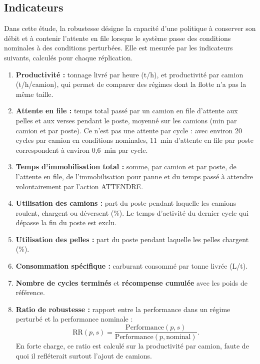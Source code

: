 \documentclass[11pt,a4paper]{article}
\newif\ifrevmarks
\newcommand{\revtag}[1]{\ifrevmarks\textsuperscript{\textcolor{red!70!black}{\scriptsize[#1]}}\fi}
\newcommand{\rev}[2]{\ifrevmarks{\color{revcolor}#2}\revtag{#1}\else#2\fi}
\newenvironment{revbloc}[1]{\par\ifrevmarks\color{revcolor}\noindent\revtag{#1}\ \fi}{\par}
\newif\ifcorrmarks
\newcommand{\corr}[1]{\ifcorrmarks\textcolor{corrcolor}{#1}\else#1\fi}
\begin{document}
\subsection{Indicateurs}
\label{sec:metrics}

\begin{revbloc}{M2, M21, M15, m18}
\corr{Dans cette étude, la robustesse désigne} la capacité d'une politique à conserver son débit et à contenir l'attente en file lorsque le système passe des conditions nominales à des conditions perturbées. Elle est mesurée par les indicateurs suivants, calculés pour chaque réplication.

\begin{enumerate}
  \item \textbf{Productivité :} tonnage livré par heure (t/h), et productivité par camion (t/h/camion), qui permet de comparer des régimes dont la flotte n'a pas la même taille.
  \item \textbf{Attente en file :} temps total passé par un camion en file d'attente aux pelles et aux verses pendant le poste, moyenné sur les camions (min par camion et par poste). Ce n'est pas une attente par cycle : \rev{T31}{avec environ 20 cycles par camion en conditions nominales, 11~min d'attente en file par poste correspondent à environ 0,6~min par cycle.}
  \item \textbf{Temps d'immobilisation total :} somme, par camion et par poste, de l'attente en file, de l'immobilisation pour panne et du temps passé à attendre volontairement par l'action ATTENDRE.
  \item \textbf{Utilisation des camions :} part du poste pendant laquelle les camions roulent, chargent ou déversent (\%). Le temps d'activité du dernier cycle qui dépasse la fin du poste est exclu.
  \item \textbf{Utilisation des pelles :} part du poste pendant laquelle les pelles chargent (\%).
  \item \textbf{Consommation spécifique :} carburant consommé par tonne livrée (L/t).
  \item \textbf{Nombre de cycles terminés} et \textbf{récompense cumulée} avec les poids de référence.
  \item \textbf{Ratio de robustesse :} rapport entre la performance dans un régime perturbé et la performance nominale :
  \begin{equation}
  \mathrm{RR}(p,s) = \frac{\mathrm{Performance}(p,s)}{\mathrm{Performance}(p,\mathrm{nominal})} .
  \label{eq:rr}
  \end{equation}
  En forte charge, ce ratio est calculé sur la productivité par camion, faute de quoi il refléterait surtout l'ajout de camions.
\end{enumerate}
\end{revbloc}
\end{document}
